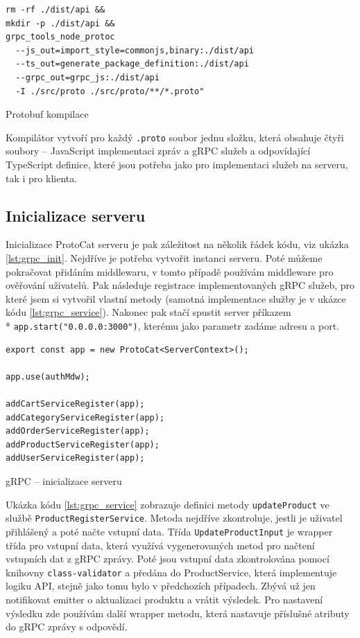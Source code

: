 \documentclass[thesis=M,czech]{FITthesis}[2019/12/23]
\begin{document}
\begin{listing}[h]
\begin{verbatim}
rm -rf ./dist/api &&
mkdir -p ./dist/api &&
grpc_tools_node_protoc 
  --js_out=import_style=commonjs,binary:./dist/api
  --ts_out=generate_package_definition:./dist/api
  --grpc_out=grpc_js:./dist/api
  -I ./src/proto ./src/proto/**/*.proto"
\end{verbatim}
\caption{Protobuf kompilace}
\label{lst:protobuf_comp}
\end{listing}


Kompilátor vytvoří pro každý \texttt{.proto} soubor jednu složku, která obsahuje čtyři soubory -- JavaScript implementaci zpráv a gRPC služeb a odpovídající TypeScript definice, které jsou potřeba jako pro implementaci služeb na serveru, tak i pro klienta.


\subsection{Inicializace serveru}
Inicializace ProtoCat serveru je pak záležitost na několik řádek kódu, viz ukázka \ref{lst:grpc_init}. Nejdříve je potřeba vytvořit instanci serveru. 
Poté můžeme pokračovat přidáním middlewaru, v tomto případě používám middleware pro ověřování uživatelů. Pak následuje registrace implementovaných gRPC služeb, pro které jsem si vytvořil vlastní metody (samotná implementace služby je v ukázce kódu \ref{lst:grpc_service}). Nakonec pak stačí spustit server příkazem \\* \texttt{app.start("0.0.0.0:3000")}, kterému jako parametr zadáme adresu a port.

\begin{listing}
\begin{verbatim}
export const app = new ProtoCat<ServerContext>();

app.use(authMdw);

addCartServiceRegister(app);
addCategoryServiceRegister(app);
addOrderServiceRegister(app);
addProductServiceRegister(app);
addUserServiceRegister(app);
\end{verbatim}
\caption{gRPC -- inicializace serveru}
\label{lst:grpc_init}
\end{listing}


Ukázka kódu \ref{lst:grpc_service} zobrazuje definici metody \texttt{updateProduct} ve službě \texttt{ProductRegisterService}. Metoda nejdříve zkontroluje, jestli je uživatel přihlášený a poté načte vstupní data. Třída \texttt{UpdateProductInput} je wrapper třída pro vstupní data, která využívá vygenerovaných metod pro načtení vstupních dat z gRPC zprávy. Poté jsou vstupní data zkontrolována pomocí knihovny \texttt{class-validator} a předána do ProductService, která implementuje logiku API, stejně jako tomu bylo v předchozích případech. Zbývá už jen notifikovat emitter o aktualizaci produktu a vrátit výsledek. Pro nastavení výsledku zde používám další wrapper metodu, která nastavuje příslušné atributy do gRPC zprávy s odpovědí.
\end{document}
